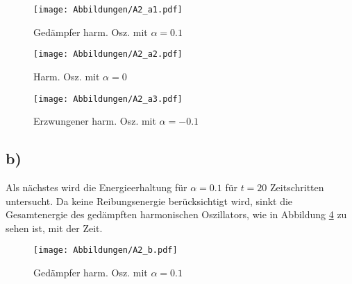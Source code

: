 \begin{figure}[H]
    \centering
    \texttt{[image: Abbildungen/A2\_a1.pdf]}
    \caption{Gedämpfer harm. Osz. mit $\alpha = 0.1$}
    \label{fig:A2_a1}
\end{figure}

\begin{figure}[H]
    \centering
    \texttt{[image: Abbildungen/A2\_a2.pdf]}
    \caption{Harm. Osz. mit $\alpha = 0$}
    \label{fig:A2_a2}
\end{figure}

\begin{figure}[H]
    \centering
    \texttt{[image: Abbildungen/A2\_a3.pdf]}
    \caption{Erzwungener harm. Osz. mit $\alpha = -0.1$}
    \label{fig:A2_a3}
\end{figure}


\subsection*{b)}
Als nächstes wird die Energieerhaltung für $\alpha = 0.1$ für $t=20$ Zeitschritten untersucht. Da keine Reibungsenergie berücksichtigt wird,
sinkt die Gesamtenergie des gedämpften harmonischen Oszillators, wie in Abbildung \ref{fig:A2_b} zu sehen ist, mit der Zeit.

\begin{figure}[H]
    \centering
    \texttt{[image: Abbildungen/A2\_b.pdf]}
    \caption{Gedämpfer harm. Osz. mit $\alpha = 0.1$}
    \label{fig:A2_b}
\end{figure}



